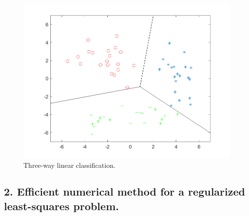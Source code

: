 \documentclass{article}
\begin{document}
\begin{figure}[H]
	\includegraphics[width=\linewidth]
	{additional_1_fig_1.png}
	\caption{Three-way linear classification.}
\end{figure}


\subsection*{2. Efficient numerical method for a regularized least-squares problem.}
\end{document}
